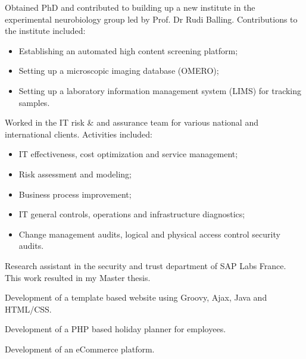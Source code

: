 \documentclass[11pt,a4paper,nolmodern, sans]{moderncv}        %
\begin{document}

{Obtained PhD and contributed to building up a new institute in the experimental neurobiology group led by Prof. Dr Rudi Balling. \newline{} Contributions to the institute included:
\begin{itemize}%
	\item Establishing an automated high content screening platform;
	\item Setting up a microscopic imaging database (OMERO);
	\item Setting up a laboratory information management system (LIMS) for tracking samples.
\end{itemize}}


{Worked in the IT risk \& and assurance team for various national and international clients. \newline{} Activities included:
\begin{itemize}
	\item IT effectiveness, cost optimization and service management;
	\item Risk assessment and modeling;
	\item Business process improvement;
	\item IT general controls, operations and infrastructure diagnostics;
	\item Change management audits, logical and physical access control security audits.
\end{itemize}}


{Research assistant in the security and trust department of SAP Labs France. This work resulted in my Master thesis.}

{Development of a template based website using Groovy, Ajax, Java and HTML/CSS.}{}

{Development of a PHP based holiday planner for employees.}

{Development of an eCommerce platform.}
\end{document}
